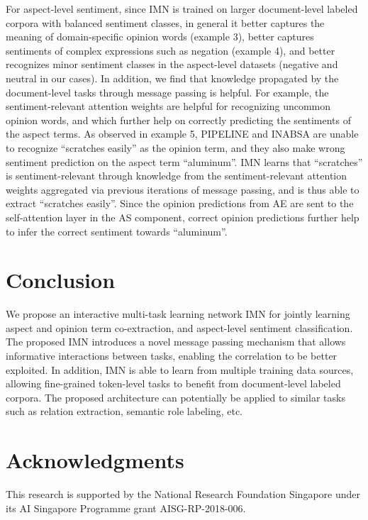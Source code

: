 \documentclass[11pt,a4paper]{article}
\begin{document}
For aspect-level sentiment, since IMN is trained on larger document-level labeled corpora with balanced sentiment classes, in general it better captures the meaning of domain-specific opinion words (example 3), better captures sentiments of complex expressions such as negation (example 4), and better recognizes minor sentiment classes in the aspect-level datasets (negative and neutral in our cases). In addition, we find that knowledge propagated by the document-level tasks through message passing is helpful.  
For example, the sentiment-relevant attention weights are helpful for recognizing uncommon opinion words, and which further help on correctly predicting the sentiments of the aspect terms. 
As observed in example 5, PIPELINE and INABSA are unable to recognize ``scratches easily'' as the opinion term, and they also make wrong sentiment prediction on the aspect term ``aluminum''. IMN learns that ``scratches'' is sentiment-relevant through knowledge from the sentiment-relevant attention weights aggregated via previous iterations of message passing, and is thus able to extract ``scratches easily''. Since the opinion predictions from AE are sent to the self-attention layer in the AS component, correct opinion predictions further help to infer the correct sentiment towards ``aluminum''.


\section{Conclusion}

We propose an interactive multi-task learning network IMN for jointly learning aspect and opinion term co-extraction, and aspect-level sentiment classification. The proposed IMN introduces a novel message passing mechanism that allows informative interactions between tasks, enabling the correlation to be better exploited. In addition, IMN is able to learn from multiple training data sources, allowing fine-grained token-level tasks to benefit from document-level labeled corpora. The proposed architecture can potentially be applied to similar tasks such as relation extraction, semantic role labeling, etc. 

\section*{Acknowledgments}
This research is supported by the National Research Foundation Singapore under its AI Singapore Programme grant AISG-RP-2018-006.



\end{document}
